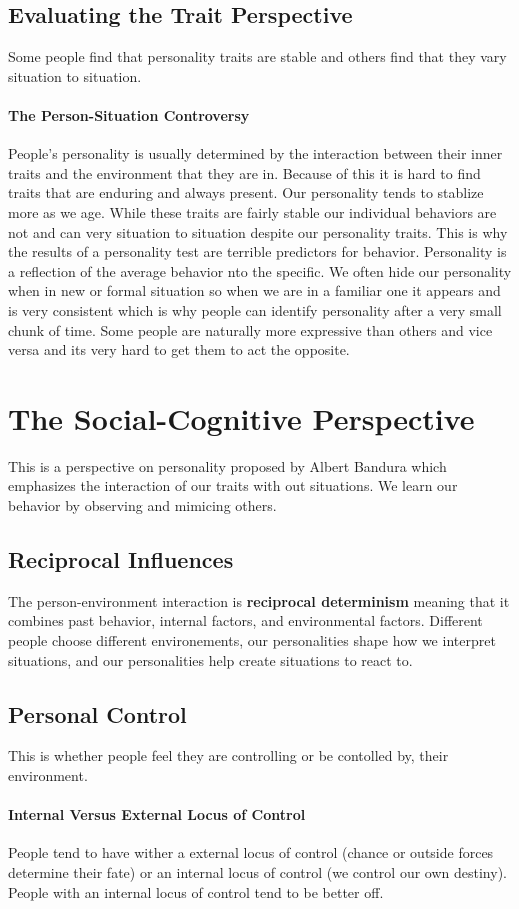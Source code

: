 \documentclass[12pt]{article}
\begin{document}
\subsection*{Evaluating the Trait Perspective}
Some people find that personality traits are stable and others find that they vary situation to situation.
\paragraph*{The Person-Situation Controversy}
People's personality is usually determined by the interaction between their inner traits and the environment that they are in. Because of this it is hard to find traits that are enduring and always present. Our personality tends to stablize more as we age. While these traits are fairly stable our individual behaviors are not and can very situation to situation despite our personality traits. This is why the results of a personality test are terrible predictors for behavior. Personality is a reflection of the average behavior nto the specific. We often hide our personality when in new or formal situation so when we are in a familiar one it appears and is very consistent which is why people can identify personality after a very small chunk of time. Some people are naturally more expressive than others and vice versa and its very hard to get them to act the opposite. 
\section*{The Social-Cognitive Perspective}
This is a perspective on personality proposed by Albert Bandura which emphasizes the interaction of our traits with out situations. We learn our behavior by observing and mimicing others. 
\subsection*{Reciprocal Influences}
The person-environment interaction is \textbf{reciprocal determinism} meaning that it combines past behavior, internal factors, and environmental factors. Different people choose different environements, our personalities shape how we interpret situations, and our personalities help create situations to react to. 
\subsection*{Personal Control}
This is whether people feel they are controlling or be contolled by, their environment. 
\paragraph*{Internal Versus External Locus of Control} 
People tend to have wither a external locus of control (chance or outside forces determine their fate) or an internal locus of control (we control our own destiny). People with an internal locus of control tend to be better off.
\end{document}
